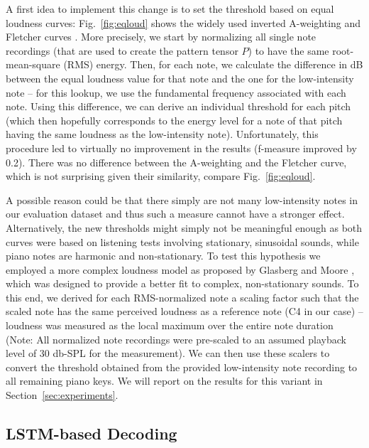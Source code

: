 \documentclass{article}
\def\dict{{P}}
\begin{document}
A first idea to implement this change is to set the threshold based on equal loudness curves: Fig.~\ref{fig:eqloud} shows the widely used inverted A-weighting and Fletcher curves \cite{FastlZ07_psychoacoustics_BOOK}.
More precisely, we start by normalizing all single note recordings (that are used to create the pattern tensor $\dict$) to have the same root-mean-square (RMS) energy. Then, for each note, we calculate the difference in dB between the equal loudness value for that note and the one for the low-intensity note -- for this lookup, we use the fundamental frequency associated with each note. Using this difference, we can  derive an individual threshold for each pitch (which then hopefully corresponds to the energy level for a note of that pitch having the same loudness as the low-intensity note).
Unfortunately, this procedure led to virtually no improvement in the results (f-measure improved by 0.2). There was no difference between the A-weighting and the Fletcher curve, which is not surprising given their similarity, compare Fig.~\ref{fig:eqloud}. 

A possible reason could be that there simply are not many low-intensity notes in our evaluation dataset and thus such a measure cannot have a stronger effect. Alternatively, the new thresholds might simply not be meaningful enough as both curves were based on listening tests involving stationary, sinusoidal sounds, while piano notes are harmonic and non-stationary.
To test this hypothesis we employed a more complex loudness model as proposed by Glasberg and Moore \cite{GlasbergM2002_ModelLoudnessTimeVarying_JAES}, which was designed to provide a better fit to complex, non-stationary sounds.
To this end, we derived for each RMS-normalized note a scaling factor such that the scaled note has the same perceived loudness as a reference note (C4 in our case) -- loudness was measured as the local maximum over the entire note duration (Note: All normalized note recordings were pre-scaled to an assumed playback level of 30 db-SPL for the measurement).
We can then use these scalers to convert the threshold obtained from the provided low-intensity note recording to all remaining piano keys.
We will report on the results for this variant in Section~\ref{sec:experiments}.

\subsection{LSTM-based Decoding}
\end{document}
